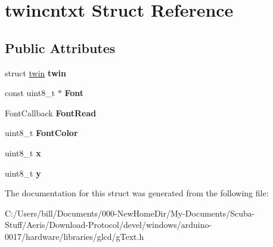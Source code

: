 \hypertarget{structtwincntxt}{
\section{twincntxt Struct Reference}
\label{structtwincntxt}
}
\subsection*{Public Attributes}
\begin{DoxyCompactItemize}
\item 
\hypertarget{structtwincntxt_ac4b7d38f6447c0ce1b0d432a23c72c41}{
struct \hyperlink{structtwin}{twin} {\bfseries twin}}
\label{structtwincntxt_ac4b7d38f6447c0ce1b0d432a23c72c41}

\item 
\hypertarget{structtwincntxt_a5aff6afcf2efc0ea39014a09047965a9}{
const uint8\_\-t $\ast$ {\bfseries Font}}
\label{structtwincntxt_a5aff6afcf2efc0ea39014a09047965a9}

\item 
\hypertarget{structtwincntxt_af0ef54fc99a96c3d34b40436397cf4af}{
FontCallback {\bfseries FontRead}}
\label{structtwincntxt_af0ef54fc99a96c3d34b40436397cf4af}

\item 
\hypertarget{structtwincntxt_ab68877e8659042f869e2862c1c37be5e}{
uint8\_\-t {\bfseries FontColor}}
\label{structtwincntxt_ab68877e8659042f869e2862c1c37be5e}

\item 
\hypertarget{structtwincntxt_aeb2e6729c998d59a718b57d3fbc707db}{
uint8\_\-t {\bfseries x}}
\label{structtwincntxt_aeb2e6729c998d59a718b57d3fbc707db}

\item 
\hypertarget{structtwincntxt_a90c60bad649489ca24e82d7ee9939f22}{
uint8\_\-t {\bfseries y}}
\label{structtwincntxt_a90c60bad649489ca24e82d7ee9939f22}

\end{DoxyCompactItemize}


The documentation for this struct was generated from the following file:\begin{DoxyCompactItemize}
\item 
C:/Users/bill/Documents/000-\/NewHomeDir/My-\/Documents/Scuba-\/Stuff/Aeris/Download-\/Protocol/devel/windows/arduino-\/0017/hardware/libraries/glcd/gText.h\end{DoxyCompactItemize}
